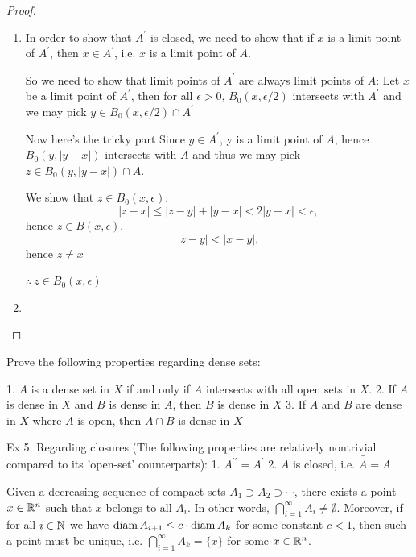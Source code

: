 \begin{proof} \
\begin{enumerate}[label=(\arabic*)]
\item In order to show that $A^\prime$ is closed, we need to show that if $x$ is a limit point of $A^\prime$, then $x\in A^\prime$, i.e. $x$ is a limit point of $A$.

So we need to show that limit points of $A^\prime$ are always limit points of $A$: 
Let $x$ be a limit point of $A^\prime$, then for all $\epsilon>0$, $B_0(x,\epsilon/2)$ intersects with $A^\prime$ and we may pick $y \in B_0(x,\epsilon/2)\cap A^\prime$

Now here's the tricky part
Since $y \in A^\prime$, y is a limit point of $A$, hence $B_0(y,|y-x|)$ intersects with $A$ and thus we may pick $z \in B_0(y,|y-x|)\cap A$.

We show that $z \in B_0(x,\epsilon)$:
\[ |z-x|\le|z-y|+|y-x|<2|y-x|<\epsilon, \]
hence $z \in B(x,\epsilon)$.
\[ |z-y|<|x-y|, \]
hence $z \neq x$

$\therefore\:z \in B_0(x,\epsilon)$

\item 
\end{enumerate}
\end{proof}

Prove the following properties regarding dense sets:

1. $A$ is a dense set in $X$ if and only if $A$ intersects with all open sets in $X$.
2. If $A$ is dense in $X$ and $B$ is dense in $A$, then $B$ is dense in $X$
3. If $A$ and $B$ are dense in $X$ where $A$ is open, then $A\cap B$ is dense in $X$

Ex 5: Regarding closures (The following properties are relatively nontrivial compared to its 'open-set' counterparts):
1. $A^{\prime\prime}=A^\prime$
2. $\bar{A}$ is closed, i.e. $\bar{\bar{A}}=\bar{A}$


\begin{theorem}
Given a decreasing sequence of compact sets $A_1\supset A_2 \supset \cdots$, there exists a point $x\in\mathbb R^n$ such that $x$ belongs to all $A_i$. In other words, $\bigcap_{i=1}^\infty A_i\neq\emptyset$. Moreover, if for all $i\in\mathbb N$ we have $\operatorname{diam} A_{i+1}\le c\cdot\operatorname{diam} A_k$ for some constant $c<1$, then such a point must be unique, i.e. $\bigcap_{i=1}^\infty A_k=\{x\}$ for some $x\in\mathbb R^n$.
\end{theorem}

